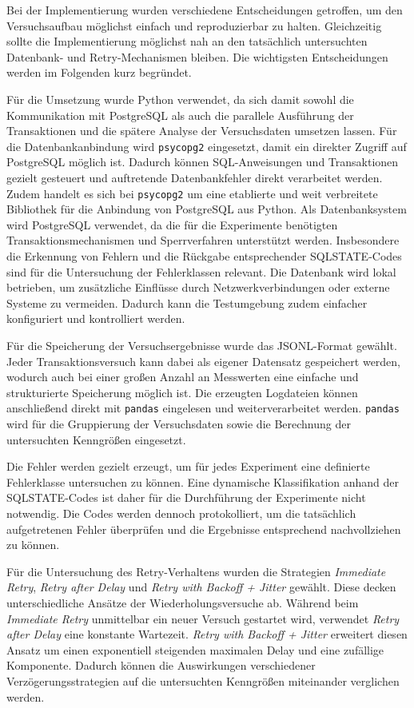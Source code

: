 
Bei der Implementierung wurden verschiedene Entscheidungen getroffen, um den Versuchsaufbau möglichst einfach und
reproduzierbar zu halten.
Gleichzeitig sollte die Implementierung möglichst nah an den tatsächlich untersuchten Datenbank- und
Retry-Mechanismen bleiben.
Die wichtigsten Entscheidungen werden im Folgenden kurz begründet.

Für die Umsetzung wurde Python verwendet, da sich damit sowohl die Kommunikation mit PostgreSQL als auch die
parallele Ausführung der Transaktionen und die spätere Analyse der Versuchsdaten umsetzen lassen.
Für die Datenbankanbindung wird \texttt{psycopg2} eingesetzt, damit ein direkter Zugriff auf PostgreSQL
möglich ist.
Dadurch können SQL-Anweisungen und Transaktionen gezielt gesteuert und auftretende Datenbankfehler direkt
verarbeitet werden.
Zudem handelt es sich bei \texttt{psycopg2} um eine etablierte und weit verbreitete Bibliothek für die Anbindung
von PostgreSQL aus Python.
Als Datenbanksystem wird PostgreSQL verwendet, da die für die Experimente benötigten Transaktionsmechanismen und
Sperrverfahren unterstützt werden.
Insbesondere die Erkennung von Fehlern und die Rückgabe entsprechender SQLSTATE-Codes sind für die Untersuchung der
Fehlerklassen relevant.
Die Datenbank wird lokal betrieben, um zusätzliche Einflüsse durch Netzwerkverbindungen oder externe Systeme zu
vermeiden.
Dadurch kann die Testumgebung zudem einfacher konfiguriert und kontrolliert werden.

Für die Speicherung der Versuchsergebnisse wurde das JSONL-Format gewählt.
Jeder Transaktionsversuch kann dabei als eigener Datensatz gespeichert werden, wodurch auch bei einer großen Anzahl
an Messwerten eine einfache und strukturierte Speicherung möglich ist.
Die erzeugten Logdateien können anschließend direkt mit \texttt{pandas} eingelesen und weiterverarbeitet werden.
\texttt{pandas} wird für die Gruppierung der Versuchsdaten sowie die Berechnung der untersuchten Kenngrößen
eingesetzt.

Die Fehler werden gezielt erzeugt, um für jedes Experiment eine definierte Fehlerklasse untersuchen zu können.
Eine dynamische Klassifikation anhand der SQLSTATE-Codes ist daher für die Durchführung der Experimente nicht
notwendig.
Die Codes werden dennoch protokolliert, um die tatsächlich aufgetretenen Fehler überprüfen und die Ergebnisse
entsprechend nachvollziehen zu können.

Für die Untersuchung des Retry-Verhaltens wurden die Strategien \emph{Immediate Retry}, \emph{Retry after Delay} und
\emph{Retry with Backoff + Jitter} gewählt.
Diese decken unterschiedliche Ansätze der Wiederholungsversuche ab.
Während beim \emph{Immediate Retry} unmittelbar ein neuer Versuch gestartet wird, verwendet \emph{Retry after Delay}
eine konstante Wartezeit.
\emph{Retry with Backoff + Jitter} erweitert diesen Ansatz um einen exponentiell steigenden maximalen Delay und
eine zufällige Komponente.
Dadurch können die Auswirkungen verschiedener Verzögerungsstrategien auf die untersuchten Kenngrößen miteinander
verglichen werden.

